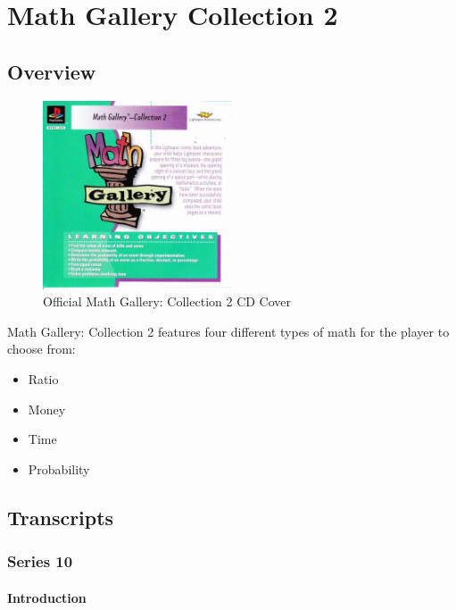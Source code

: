 \chapter{Math Gallery Collection 2}

\section{Overview}

\begin{figure}[H]
    \centering
    \includegraphics[width=0.5\textwidth]{Games/MathGalleryCollection/Images/MathGalleryCollection2Cover.jpg}
    \caption{Official Math Gallery: Collection 2 CD Cover}
\end{figure}

Math Gallery: Collection 2 features four different types of math for the player to choose from:

\begin{itemize}
    \item Ratio
    \item Money
    \item Time
    \item Probability
\end{itemize}

\section{Transcripts}

\subsection{Series 10}

\subsubsection{Introduction}

